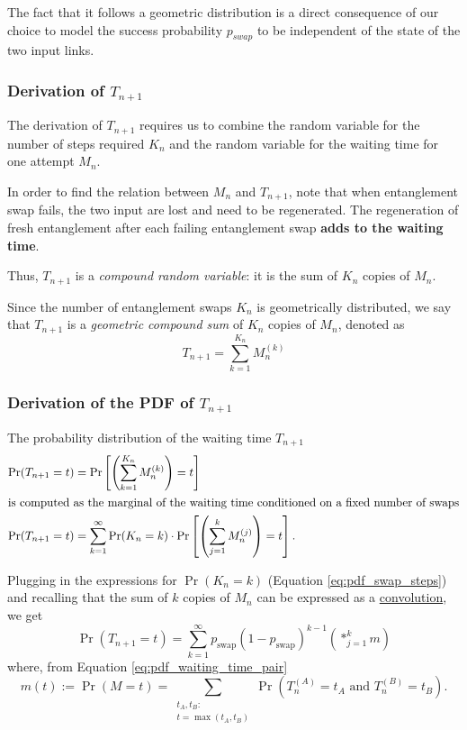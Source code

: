 \documentclass{masterthesis}
\begin{document}
The fact that it follows a geometric distribution is a direct consequence of our choice to model the success probability $p_{swap}$ to be independent of the state of the two input links. 

\subsubsection*{Derivation of $T_{n+1}$}
The derivation of $T_{n+1}$ requires us to combine the random variable for the number of steps required $K_n$ and the random variable for the waiting time for one attempt $M_n$.

In order to find the relation between $M_n$ and $T_{n+1}$, note that when entanglement swap fails, the two input are lost and need to be
regenerated. The regeneration of fresh entanglement after each failing entanglement swap \textbf{adds to the waiting time}. 

Thus, $T_{n+1}$ is a \textit{compound random variable}: it is the sum of $K_n$ copies of $M_n$. 

Since the number of entanglement swaps $K_n$ is geometrically distributed, we say that $T_{n+1}$ is a \textit{geometric compound sum} of $K_n$ copies of $M_n$, denoted as
\begin{equation}
    T_{n+1}=\sum_{k=1}^{K_{n}} M_{n}^{(k)}
\end{equation}

\subsubsection*{Derivation of the PDF of $T_{n+1}$}

The probability distribution of the waiting time $T_{n+1}$
\begin{align}
    \Pr(T_{n+1} = t) &= \Pr\left[\left(\sum_{k=1}^{K_{n}} M_{n}^{(k)}\right) = t\right] \nonumber \\
    \intertext{is computed as the marginal of the waiting time conditioned on a fixed number of swaps}
    \Pr(T_{n+1} = t) &= \sum_{k=1}^{\infty} \Pr(K_{n} = k) \cdot \Pr\left[\left( \sum_{j=1}^{k} M_{n}^{(j)} \right) = t\right].
\end{align}

Plugging in the expressions for $\Pr(K_n = k)$ (Equation \ref{eq:pdf_swap_steps}) and recalling that the sum of $k$ copies of $M_n$ can be expressed as a \hyperref[eq:convolution]{convolution}, we get
\begin{equation}\label{eq:waiting_time_swap}
    \Pr(T_{n+1} = t) = \sum_{k=1}^{\infty} p_{\text{swap}}(1 - p_{\text{swap}})^{k-1} \left( \ast_{j=1}^{k} m \right)
\end{equation}
where, from Equation \ref{eq:pdf_waiting_time_pair}
\begin{equation}\label{eq:pdf_waiting_time_pair_convolution}
    m(t) := \Pr(M = t) = \sum_{\substack{t_A, t_B: \\ t = \max(t_A, t_B)}} \Pr(T_n^{(A)} = t_A \text{ and } T_n^{(B)} = t_B) .
\end{equation}
\end{document}
